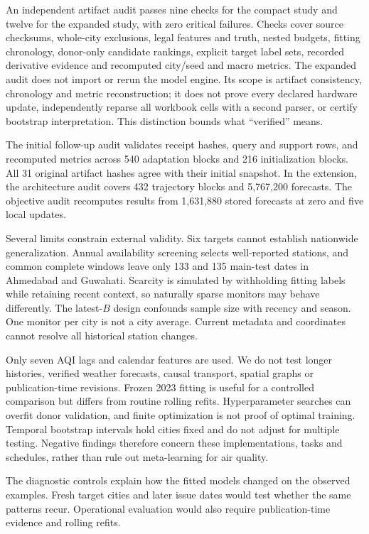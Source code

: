 \documentclass[conference]{IEEEtran}
\begin{document}
An independent artifact audit passes nine checks for the compact study and twelve for the expanded study, with zero critical failures. Checks cover source checksums, whole-city exclusions, legal features and truth, nested budgets, fitting chronology, donor-only candidate rankings, explicit target label sets, recorded derivative evidence and recomputed city/seed and macro metrics. The expanded audit does not import or rerun the model engine. Its scope is artifact consistency, chronology and metric reconstruction; it does not prove every declared hardware update, independently reparse all workbook cells with a second parser, or certify bootstrap interpretation. This distinction bounds what ``verified'' means.

The initial follow-up audit validates receipt hashes, query and support rows, and recomputed metrics across 540 adaptation blocks and 216 initialization blocks. All 31 original artifact hashes agree with their initial snapshot. In the extension, the architecture audit covers 432 trajectory blocks and 5,767,200 forecasts. The objective audit recomputes results from 1,631,880 stored forecasts at zero and five local updates.

Several limits constrain external validity. Six targets cannot establish nationwide generalization. Annual availability screening selects well-reported stations, and common complete windows leave only 133 and 135 main-test dates in Ahmedabad and Guwahati. Scarcity is simulated by withholding fitting labels while retaining recent context, so naturally sparse monitors may behave differently. The latest-$B$ design confounds sample size with recency and season. One monitor per city is not a city average. Current metadata and coordinates cannot resolve all historical station changes.

Only seven AQI lags and calendar features are used. We do not test longer histories, verified weather forecasts, causal transport, spatial graphs or publication-time revisions. Frozen 2023 fitting is useful for a controlled comparison but differs from routine rolling refits. Hyperparameter searches can overfit donor validation, and finite optimization is not proof of optimal training. Temporal bootstrap intervals hold cities fixed and do not adjust for multiple testing. Negative findings therefore concern these implementations, tasks and schedules, rather than rule out meta-learning for air quality.

The diagnostic controls explain how the fitted models changed on the observed examples. Fresh target cities and later issue dates would test whether the same patterns recur. Operational evaluation would also require publication-time evidence and rolling refits.
\end{document}

